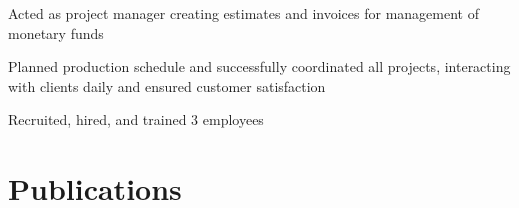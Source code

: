 \documentclass[]{deedy-resume-openfont}
\begin{document}
\begin{minipage}[t]{0.63\textwidth}
\begin{tightemize}
\item {Acted as project manager creating estimates and invoices for management of monetary funds}
\item {Planned production schedule and successfully coordinated all projects, interacting with clients daily and ensured customer satisfaction}
\item {Recruited, hired, and trained 3 employees}
\end{tightemize}
\sectionsep

\sectionsep

\sectionsep

\sectionsep



\section{Publications}
\renewcommand\refname{\vspace{-10mm}} %


\nocite{*}

\end{minipage}
\end{document}
